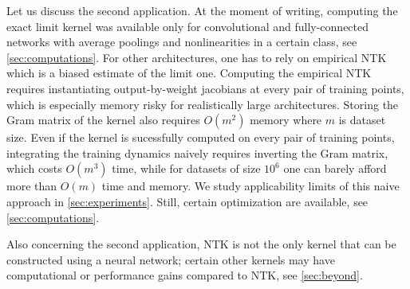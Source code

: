 \documentclass{article}
\begin{document}
    Let us discuss the second application.
    At the moment of writing, computing the exact limit kernel was available only for convolutional and fully-connected networks with average poolings and nonlinearities in a certain class, see \cref{sec:computations}.
    For other architectures, one has to rely on empirical NTK which is a biased estimate of the limit one.
    Computing the empirical NTK requires instantiating output-by-weight jacobians at every pair of training points, which is especially memory risky for realistically large architectures.
    Storing the Gram matrix of the kernel also requires $O(m^2)$ memory where $m$ is dataset size.
    Even if the kernel is sucessfully computed on every pair of training points, integrating the training dynamics naively requires inverting the Gram matrix, which costs $O(m^3)$ time, while for datasets of size $10^6$ one can barely afford more than $O(m)$ time and memory.
    We study applicability limits of this naive approach in \cref{sec:experiments}.
    Still, certain optimization are available, see \cref{sec:computations}.

    Also concerning the second application, NTK is not the only kernel that can be constructed using a neural network; certain other kernels may have computational or performance gains compared to NTK, see \cref{sec:beyond}.


    
    
        
\end{document}
